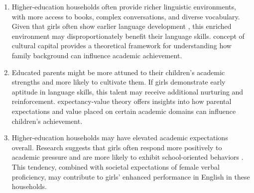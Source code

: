 \documentclass[12pt,a4paper,onecolumn]{article}
\numberwithin{equation}{section}
\begin{document}
\begin{itemize}
\begin{enumerate}
    \item Higher-education households often provide richer linguistic environments, with more access to books, complex conversations, and diverse vocabulary. Given that girls often show earlier language development \parencite{eriksson2012differences}, this enriched environment may disproportionately benefit their language skills. \textcite{bourdieu1977cultural} concept of cultural capital provides a theoretical framework for understanding how family background can influence academic achievement.
    \item Educated parents might be more attuned to their children's academic strengths and more likely to cultivate them. If girls demonstrate early aptitude in language skills, this talent may receive additional nurturing and reinforcement. \textcite{eccles1983expectancies} expectancy-value theory offers insights into how parental expectations and value placed on certain academic domains can influence children's achievement.
    \item Higher-education households may have elevated academic expectations overall. Research suggests that girls often respond more positively to academic pressure and are more likely to exhibit school-oriented behaviors \parencite{buchmann2008gender}. This tendency, combined with societal expectations of female verbal proficiency, may contribute to girls' enhanced performance in English in these households.
\end{enumerate}


\end{itemize}
\end{document}
